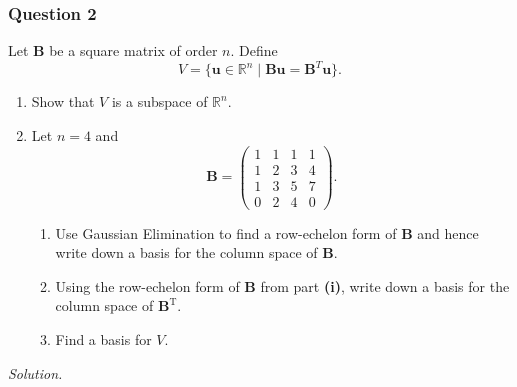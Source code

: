 \documentclass[12pt]{article}
\begin{document}
\subsubsection*{Question 2}
Let \( \mathbf{B} \) be a square matrix of order \( n \). Define 
\[
V = \{ \mathbf{u} \in \mathbb{R}^n \mid \mathbf{Bu} = \mathbf{B}^T \mathbf{u} \}.
\]
\begin{enumerate}[label=\textbf{(\alph*)}]
\itemsep 0em
    \item Show that \( V \) is a subspace of \( \mathbb{R}^n \).

    \item Let \( n = 4 \) and 
    \[
    \mathbf{B} = \begin{pmatrix}
        1 & 1 & 1 & 1 \\
        1 & 2 & 3 & 4 \\
        1 & 3 & 5 & 7 \\
        0 & 2 & 4 & 0
    \end{pmatrix}.
    \]
    \begin{enumerate}[label=\textbf{(\roman*)}]
        \item Use Gaussian Elimination to find a row-echelon form of \( \mathbf{B} \) and hence write down a basis for the column space of \( \mathbf{B} \). 
        \item Using the row-echelon form of \( \mathbf{B} \) from part \textbf{(i)}, write down a basis for the column space of \( \mathbf{B}^\text{T}\).
        \item Find a basis for \( V \). 
    \end{enumerate}
\end{enumerate}
\textit{Solution.}
\end{document}
